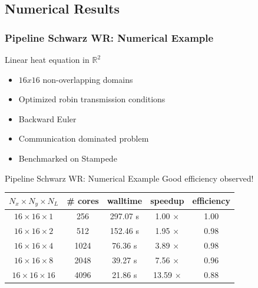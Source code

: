 \documentclass[]{beamer}
\begin{document}
\subsection{Numerical Results}
\begin{frame}
  \frametitle{Pipeline Schwarz WR: Numerical Example}

  Linear heat equation in $\mathbb{R}^2$
  \begin{itemize}
  \item $16x16$ non-overlapping domains
  \item Optimized robin transmission conditions
  \item Backward Euler
  \item Communication dominated problem
  \item Benchmarked on Stampede
  \end{itemize}

\end{frame}


\begin{frame}{Pipeline Schwarz WR: Numerical Example}
  Good efficiency observed!
  \begin{center}
    \begin{tabular}{c|c|c|c|c}
      $N_x \times N_y \times N_L$ &
      \# cores & walltime & speedup & efficiency\\
      \hline
      $16 \times 16 \times 1 $&
      256  & 297.07 s & 1.00 $\times$  & 1.00 \\
      $16 \times 16 \times 2 $&
      512  & 152.46 s & 1.95 $\times$ & 0.98 \\
      $16 \times 16 \times 4 $&
      1024 & 76.36 s &  3.89 $\times$ & 0.98 \\
      $16 \times 16 \times 8 $&
      2048 & 39.27 s  & 7.56 $\times$ & 0.96 \\
      $16 \times 16 \times 16 $&
      4096 & 21.86 s  & 13.59 $\times$ & 0.88 \\
    \end{tabular}
  \end{center}

\end{frame}
\end{document}
